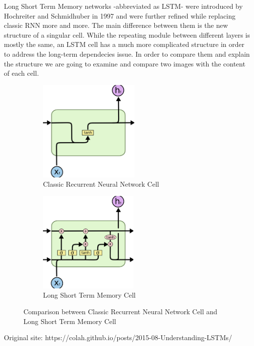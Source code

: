 Long Short Term Memory networks -abbreviated as LSTM- were introduced by Hochreiter and Schmidhuber in 1997 \cite{hochreiter1997long} and were further refined while replacing classic RNN more and more. The main difference between them is the new structure of a singular cell. While the repeating module between different layers is mostly the same, an LSTM cell has a much more complicated structure in order to address the long-term dependecies issue. In order to compare them and explain the structure we are going to examine and compare two images with the content of each cell.

\begin{figure}[H]

\begin{subfigure}{0.47\textwidth}
\includegraphics[width=0.9\linewidth, height=5cm]{images/RNNCell.png} 
\caption{Classic Recurrent Neural Network Cell}
\label{fig:rnncell}
\end{subfigure}
\begin{subfigure}{0.47\textwidth}
\includegraphics[width=0.9\linewidth, height=5cm]{images/LSTMCell.png}
\caption{Long Short Term Memory Cell}
\label{fig:lstmcell}
\end{subfigure}

\caption{Comparison between Classic Recurrent Neural Network Cell and Long Short Term Memory Cell}
\label{fig:rnnandlstmcomparison}
\end{figure}
\begin{flushright}
Original site: https://colah.github.io/posts/2015-08-Understanding-LSTMs/
\end{flushright}




